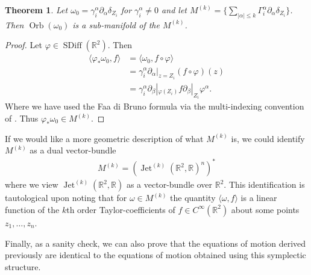 \documentclass[12pt]{amsart}
\newcommand{\R}{\ensuremath{\mathbb{R}}}
\newtheorem{thm}{Theorem}[section]
\DeclareMathOperator{\SDiff}{SDiff}
\DeclareMathOperator{\Jet}{Jet}
\DeclareMathOperator{\Orb}{Orb}
\begin{document}
\begin{thm}
	Let $\omega_0 = \gamma_i^\alpha \partial_{\alpha} \delta_{Z_i}$ for $\gamma_i^\alpha \neq 0$ and let
	$M^{(k)} = \{ \sum_{|\alpha| \leq k} \Gamma_i^\alpha \partial_{\alpha} \delta_{Z_i} \}$.
	Then $\Orb(\omega_0)$ is a sub-manifold of the $M^{(k)}$.
\end{thm}
\begin{proof}
	Let $\varphi \in \SDiff(\R^2)$.  Then
	\begin{align*}
		\langle \varphi_* \omega_0 , f \rangle &= \langle \omega_0 , f \circ \varphi \rangle \\
                &= \gamma_i^\alpha \partial_{\alpha}|_{z=Z_i} (f \circ\varphi)(z) \\
                &= \gamma_i^\alpha \partial_{\beta}|_{\varphi(Z_i)} f \partial_\beta|_{Z_i} \varphi^\alpha.
	\end{align*}
        Where we have used the Faa di Bruno formula via the multi-indexing convention of \cite{Jacobs2014b}.
        Thus $\varphi_* \omega_0 \in M^{(k)}$.
\end{proof}

If we would like a more geometric description of what $M^{(k)}$ is,
we could identify $M^{(k)}$ as a dual vector-bundle
\begin{align*}
  M^{(k)} = \left(\Jet^{(k)}( \R^2 , \R)^n \right)^*
\end{align*}
where we view $\Jet^{(k)}( \R^2 , \R)$ as a vector-bundle over $\R^2$.
This identification is tautological upon noting that for $\omega \in M^{(k)}$
the quantity $ \langle \omega , f \rangle$
is a linear function of the $k$th order Taylor-coefficients of $f \in C^\infty(\R^2)$
about some points $z_1,\dots,z_n$.

Finally, as a sanity check, we can also prove that the equations of motion derived previously are identical to
the equations of motion obtained using this symplectic structure.
\end{document}
